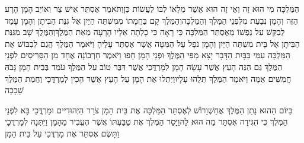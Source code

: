 \documentclass[../main/main.tex]{subfiles}
\begin{document}
\begin{multicols}{\ncols}
הַמַּלְכָּה מִי הוּא זֶה וְאֵי זֶה הוּא אֲשֶׁר מְלָאוֹ לִבּוֹ לַעֲשׂוֹת כֵּן\PreVerseSpace{}וַתֹּאמֶר אֶסְתֵּר אִישׁ צַר וְאוֹיֵב הָמָן הָרָע הַזֶּה וְהָמָן נִבְעַת מִלִּפְנֵי הַמֶּלֶךְ וְהַמַּלְכָּה\PreVerseSpace{}וְהַמֶּלֶךְ קָם בַּחֲמָתוֹ מִמִּשְׁתֵּה הַיַּיִן אֶל גִּנַּת הַבִּיתָן וְהָמָן עָמַד לְבַקֵּשׁ עַל נַפְשׁוֹ מֵאֶסְתֵּר הַמַּלְכָּה כִּי רָאָה כִּי כָלְתָה אֵלָיו הָרָעָה מֵאֵת הַמֶּלֶךְ\PreVerseSpace{}וְהַמֶּלֶךְ שָׁב מִגִּנַּת הַבִּיתָן אֶל בֵּית מִשְׁתֵּה הַיַּיִן וְהָמָן נֹפֵל עַל הַמִּטָּה אֲשֶׁר אֶסְתֵּר עָלֶיהָ וַיֹּאמֶר הַמֶּלֶךְ הֲגַם לִכְבּוֹשׁ אֶת הַמַּלְכָּה עִמִּי בַּבָּיִת הַדָּבָר יָצָא מִפִּי הַמֶּלֶךְ וּפְנֵי הָמָן חָפוּ \ClosedSection{}וַיֹּאמֶר חַרְבוֹנָה אֶחָד מִן הַסָּרִיסִים לִפְנֵי הַמֶּלֶךְ גַּם הִנֵּה הָעֵץ אֲשֶׁר עָשָׂה הָמָן לְמָרְדֳּכַי אֲשֶׁר דִּבֶּר טוֹב עַל הַמֶּלֶךְ עֹמֵד בְּבֵית הָמָן גָּבֹהַּ חֲמִשִּׁים אַמָּה וַיֹּאמֶר הַמֶּלֶךְ תְּלֻהוּ עָלָיו\PreVerseSpace{}וַיִּתְלוּ אֶת הָמָן עַל הָעֵץ אֲשֶׁר הֵכִין לְמָרְדֳּכָי וַחֲמַת הַמֶּלֶךְ שָׁכָכָה\OpenSection{}\par
{}בַּיּוֹם הַהוּא נָתַן הַמֶּלֶךְ אֲחַשְׁוֵרוֹשׁ לְאֶסְתֵּר הַמַּלְכָּה אֶת בֵּית הָמָן צֹרֵר הַיְּהוּדִיּים וּמָרְדֳּכַי בָּא לִפְנֵי הַמֶּלֶךְ כִּי הִגִּידָה אֶסְתֵּר מַה הוּא לָהּ\PreVerseSpace{}וַיָּסַר הַמֶּלֶךְ אֶת טַבַּעְתּוֹ אֲשֶׁר הֶעֱבִיר מֵהָמָן וַיִּתְּנָהּ לְמָרְדֳּכָי וַתָּשֶׂם אֶסְתֵּר אֶת מָרְדֳּכַי עַל בֵּית הָמָן\OpenSection{}\par

\end{multicols}
\end{document}
